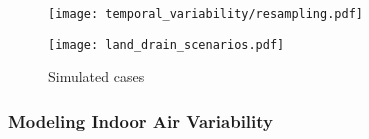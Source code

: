 \documentclass[journal=esthag,manuscript=article]{achemso}
\begin{document}






\begin{figure}[!h]
	\centering
	\begin{minipage}[c]{0.49\textwidth}
		\centering
    \caption{ }
    \label{fig:resampling}
    \texttt{[image: temporal\_variability/resampling.pdf]}
	\end{minipage}
	\begin{minipage}[c]{0.49\textwidth}
		\centering
    \caption{Simulated cases}
    \label{fig:land_drain_scenarios}
    \texttt{[image: land\_drain\_scenarios.pdf]}
	\end{minipage}
\end{figure}



\subsubsection{Modeling Indoor Air Variability}
\end{document}
